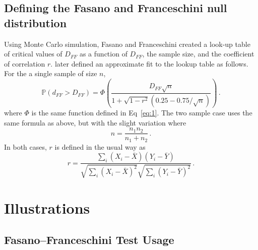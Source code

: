 \documentclass[codesnippet]{jss}
\begin{document}
\subsection{Defining the Fasano and Franceschini null distribution}

Using Monte Carlo simulation, Fasano and Franceschini created a
look-up table of critical values of $D_{FF}$ as a function of
$D_{FF}$, the sample size, and the coefficient of correlation $r$.
\cite{numericalRecipes} later defined an approximate fit to the lookup table
as follows.
%
For the a single sample of size $n$,
\begin{equation} \label{eq:4}
\mathbb{P}(d_{FF} > D_{FF}) = \Phi \left( \frac{D_{FF}\sqrt{n}}{1+\sqrt{1-r^2}(0.25-0.75/\sqrt{n})} \right) \, .
\end{equation}
where $\Phi$ is the same function defined in Eq~\ref{eq:1}.
The two sample case uses the same formula as above, but with the slight variation where
\begin{equation} \label{eq:5}
n = \frac{n_1n_2}{n_1+n_2}\, .
\end{equation}
In both cases, $r$ is defined in the usual way as
\begin{equation} \label{eq:6}
r = \frac{\sum_{i}(X_i-\bar{X})(Y_i-\bar{Y})}{\sqrt{\sum_{i}(X_i-\bar{X})^2}\sqrt{\sum_{i}(Y_i-\bar{Y})^2}}\, .
\end{equation}


\section{Illustrations} \label{sec:illustrations}

\subsection{Fasano--Franceschini Test Usage}
\end{document}
